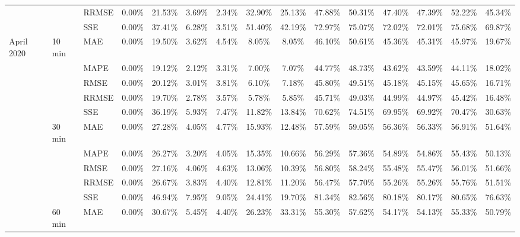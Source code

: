 {\begin{longtable}[htb!]{lllcccccccccccc}
{} & {} & {RRMSE} & {0.00\%} & {21.53\%} & {3.69\%} & {2.34\%} & {32.90\%} & {25.13\%} & {47.88\%} & {50.31\%} & {47.40\%} & {47.39\%} & {52.22\%} & {45.34\%} \\
{} & {} & {SSE} & {0.00\%} & {37.41\%} & {6.28\%} & {3.51\%} & {51.40\%} & {42.19\%} & {72.97\%} & {75.07\%} & {72.02\%} & {72.01\%} & {75.68\%} & {69.87\%} \\ \hline
{April 2020} & {10 min} & {MAE} & {0.00\%} & {19.50\%} & {3.62\%} & {4.54\%} & {8.05\%} & {8.05\%} & {46.10\%} & {50.61\%} & {45.36\%} & {45.31\%} & {45.97\%} & {19.67\%} \\
{} & {} & {MAPE} & {0.00\%} & {19.12\%} & {2.12\%} & {3.31\%} & {7.00\%} & {7.07\%} & {44.77\%} & {48.73\%} & {43.62\%} & {43.59\%} & {44.11\%} & {18.02\%} \\
{} & {} & {RMSE} & {0.00\%} & {20.12\%} & {3.01\%} & {3.81\%} & {6.10\%} & {7.18\%} & {45.80\%} & {49.51\%} & {45.18\%} & {45.15\%} & {45.65\%} & {16.71\%} \\
{} & {} & {RRMSE} & {0.00\%} & {19.70\%} & {2.78\%} & {3.57\%} & {5.78\%} & {5.85\%} & {45.71\%} & {49.03\%} & {44.99\%} & {44.97\%} & {45.42\%} & {16.48\%} \\
{} &  & {SSE} & {0.00\%} & {36.19\%} & {5.93\%} & {7.47\%} & {11.82\%} & {13.84\%} & {70.62\%} & {74.51\%} & {69.95\%} & {69.92\%} & {70.47\%} & {30.63\%} \\
{} & {30 min} & {MAE} & {0.00\%} & {27.28\%} & {4.05\%} & {4.77\%} & {15.93\%} & {12.48\%} & {57.59\%} & {59.05\%} & {56.36\%} & {56.33\%} & {56.91\%} & {51.64\%} \\
{} & {} & {MAPE} & {0.00\%} & {26.27\%} & {3.20\%} & {4.05\%} & {15.35\%} & {10.66\%} & {56.29\%} & {57.36\%} & {54.89\%} & {54.86\%} & {55.43\%} & {50.13\%} \\
{} & {} & {RMSE} & {0.00\%} & {27.16\%} & {4.06\%} & {4.63\%} & {13.06\%} & {10.39\%} & {56.80\%} & {58.24\%} & {55.48\%} & {55.47\%} & {56.01\%} & {51.66\%} \\
{} & {} & {RRMSE} & {0.00\%} & {26.67\%} & {3.83\%} & {4.40\%} & {12.81\%} & {11.20\%} & {56.47\%} & {57.70\%} & {55.26\%} & {55.26\%} & {55.76\%} & {51.51\%} \\
{} &  & {SSE} & {0.00\%} & {46.94\%} & {7.95\%} & {9.05\%} & {24.41\%} & {19.70\%} & {81.34\%} & {82.56\%} & {80.18\%} & {80.17\%} & {80.65\%} & {76.63\%} \\
{} & {60 min} & {MAE} & {0.00\%} & {30.67\%} & {5.45\%} & {4.40\%} & {26.23\%} & {33.31\%} & {55.30\%} & {57.62\%} & {54.17\%} & {54.13\%} & {55.33\%} & {50.79\%} \\

\end{longtable}}
